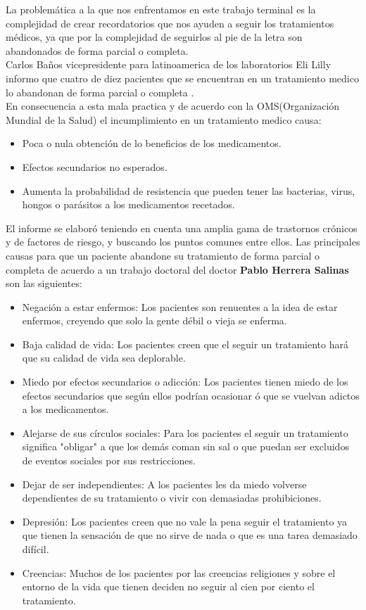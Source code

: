 La problemática a la que nos enfrentamos en este trabajo terminal es la complejidad de crear recordatorios que nos ayuden a seguir los tratamientos médicos, ya que por la complejidad de seguirlos al pie de la letra son abandonados de forma parcial o completa.\\
Carlos Baños vicepresidente para latinoamerica de los laboratorios Eli Lilly informo que cuatro de diez pacientes que se encuentran en un tratamiento medico lo abandonan de forma parcial o completa \cite{Referencia1}.\\
En consecuencia a esta mala practica y de acuerdo con la OMS(Organización Mundial de la Salud) el incumplimiento en un tratamiento medico causa:
\begin{itemize}
	\item Poca o nula obtención de lo beneficios de los medicamentos.
	\item Efectos secundarios no esperados.
	\item Aumenta la probabilidad de resistencia que pueden tener las bacterias, virus, hongos o parásitos a los medicamentos recetados.
\end{itemize}
El informe se elaboró teniendo en cuenta una amplia gama de trastornos crónicos y de factores de riesgo, y buscando los puntos comunes entre ellos\cite{Referencia2}.
Las principales causas para que un paciente abandone su tratamiento de forma parcial o completa de acuerdo a un trabajo doctoral del doctor \textbf{Pablo Herrera Salinas}\cite{Referencia3} son las siguientes:
\begin{itemize}
	\item Negación a estar enfermos: Los pacientes son renuentes a la idea de estar enfermos, creyendo que solo la gente débil o vieja se enferma.
	\item Baja calidad de vida: Los pacientes creen que el seguir un tratamiento hará que su calidad de vida sea deplorable.
	\item Miedo por efectos secundarios o adicción: Los pacientes tienen miedo de los efectos secundarios que según ellos podrían ocasionar ó que se vuelvan adictos a los medicamentos.
	\item Alejarse de sus círculos sociales: Para los pacientes el seguir un tratamiento significa "obligar" a que los demás coman sin sal o que puedan ser excluidos de eventos sociales por sus restricciones.
	\item Dejar de ser independientes: A los pacientes les da miedo volverse dependientes de su tratamiento o vivir con demasiadas prohibiciones.
	\item Depresión: Los pacientes creen que no vale la pena seguir el tratamiento ya que tienen la sensación de que no sirve de nada o que es una tarea demasiado difícil.
	\item Creencias: Muchos de los pacientes por las creencias religiones y sobre el entorno de la vida que tienen deciden no seguir al cien por ciento el tratamiento.
\end{itemize}

